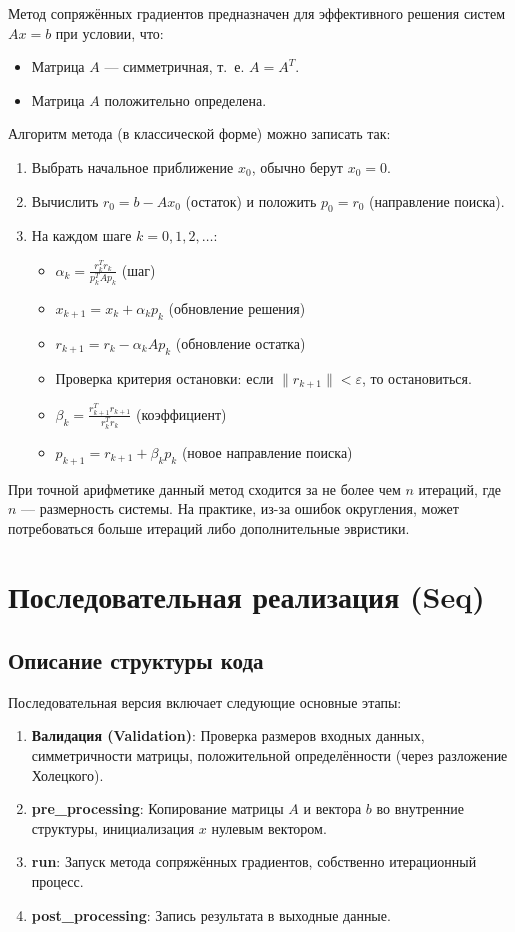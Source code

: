 \documentclass[12pt]{article}
\begin{document}
\hspace*{1.25em}Метод сопряжённых градиентов предназначен для эффективного решения систем $Ax = b$ при условии, что:
\begin{itemize}
    \item Матрица $A$ --- симметричная, т.~е. $A = A^T$.
    \item Матрица $A$ положительно определена.
\end{itemize}
Алгоритм метода (в классической форме) можно записать так:

\begin{enumerate}
    \item Выбрать начальное приближение $x_0$, обычно берут $x_0 = 0$.
    \item Вычислить $r_0 = b - A x_0$ (остаток) и положить $p_0 = r_0$ (направление поиска).
    \item На каждом шаге $k = 0,1,2,\ldots$:
    \begin{itemize}
        \item $\alpha_k = \frac{r_k^T r_k}{p_k^T A p_k}$ (шаг)
        \item $x_{k+1} = x_k + \alpha_k p_k$ (обновление решения)
        \item $r_{k+1} = r_k - \alpha_k A p_k$ (обновление остатка)
        \item Проверка критерия остановки: если $\|r_{k+1}\| < \varepsilon$, то остановиться.
        \item $\beta_k = \frac{r_{k+1}^T r_{k+1}}{r_k^T r_k}$ (коэффициент)
        \item $p_{k+1} = r_{k+1} + \beta_k p_k$ (новое направление поиска)
    \end{itemize}
\end{enumerate}

При точной арифметике данный метод сходится за не более чем $n$ итераций, где $n$ --- размерность системы. На практике, из-за ошибок округления, может потребоваться больше итераций либо дополнительные эвристики.

\section{Последовательная реализация (Seq)}

\subsection{Описание структуры кода}
Последовательная версия включает следующие основные этапы:
\begin{enumerate}
    \item \textbf{Валидация (Validation)}: Проверка размеров входных данных, симметричности матрицы, положительной определённости (через разложение Холецкого).
    \item \textbf{pre\_processing}: Копирование матрицы $A$ и вектора $b$ во внутренние структуры, инициализация $x$ нулевым вектором.
    \item \textbf{run}: Запуск метода сопряжённых градиентов, собственно итерационный процесс.
    \item \textbf{post\_processing}: Запись результата в выходные данные.
\end{enumerate}
\end{document}
